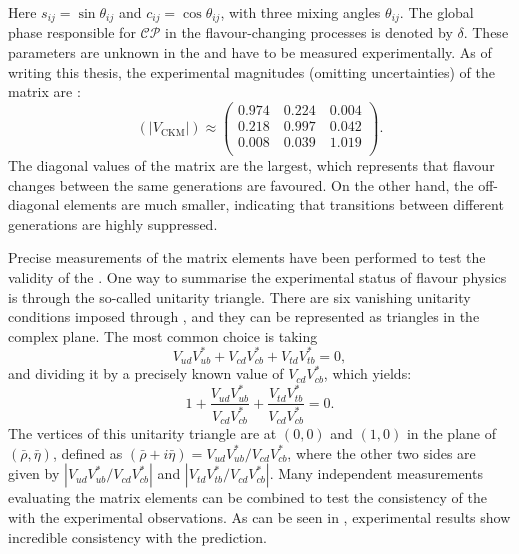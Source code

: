 Here $s_{ij}=\sin\theta_{ij}$ and $c_{ij}=\cos\theta_{ij}$, with three mixing angles $\theta_{ij}$.
The global phase responsible for $\mathcal{CP}$ in the flavour-changing processes is denoted by $\delta$.
These parameters are unknown in the \SM and have to be measured experimentally.
As of writing this thesis, the experimental magnitudes (omitting uncertainties) of the \CKM matrix are \cite{Workman:2022ynf}:
\begin{equation}
    (|V_{\mathrm{CKM}}|) \approx 
    \begin{pmatrix}
        0.974 \quad 0.224 \quad 0.004\\
        0.218 \quad 0.997 \quad 0.042\\
        0.008 \quad 0.039 \quad 1.019\\
    \end{pmatrix}.
\end{equation}
The diagonal values of the \CKM matrix are the largest, which represents that flavour changes between the same generations are favoured.
On the other hand, the off-diagonal elements are much smaller, indicating that transitions between different generations are highly suppressed.

Precise measurements of the \CKM matrix elements have been performed to test the validity of the \SM.
One way to summarise the experimental status of flavour physics is through the so-called unitarity triangle.
There are six vanishing unitarity conditions imposed through , and they can be represented as triangles in the complex plane.
The most common choice is taking
\begin{equation}
    V^{}_{ud}V_{ub}^* + V^{}_{cd}V^*_{cb} + V^{}_{td}V_{tb}^* =0,
\end{equation}
and dividing it by a precisely known value of $V^{}_{cd}V^*_{cb}$, which yields:
\begin{equation}
    1+\frac{V^{}_{ud}V_{ub}^*}{V^{}_{cd}V_{cb}^*}+\frac{V^{}_{td}V_{tb}^*}{V^{}_{cd}V_{cb}^*} = 0.
\end{equation}
The vertices of this unitarity triangle are at $(0,0)$ and $(1,0)$ in the plane of $(\bar{\rho},\bar{\eta})$, defined as $(\bar{\rho}+i\bar{\eta})=V^{}_{ud}V_{ub}^*/V^{}_{cd}V_{cb}^*$,
where the other two sides are given by $|V^{}_{ud}V_{ub}^*/V^{}_{cd}V_{cb}^*|$ and $|V^{}_{td}V_{tb}^*/V^{}_{cd}V_{cb}^*|$.
Many independent measurements evaluating the \CKM matrix elements can be combined to test the consistency of the \SM with the experimental observations.
As can be seen in , experimental results show incredible consistency with the \SM prediction.

